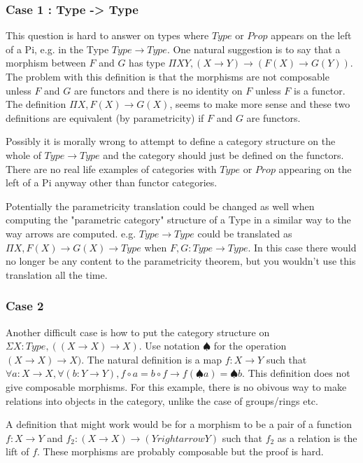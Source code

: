 \documentclass[12pt]{article} %
\theoremstyle{definition}
\theoremstyle{definition}
\theoremstyle{definition}
\theoremstyle{definition}
\begin{document}
\subsubsection{Case 1 : Type -> Type}

This question is hard to answer on types where $Type$ or $Prop$ appears on the left of a Pi,
e.g. in the Type $Type\rightarrow Type$. One natural suggestion is to say that a morphism between
$F$ and $G$ has type $\Pi X Y, (X \rightarrow Y) \rightarrow (F(X) \rightarrow G(Y))$. The problem 
with this definition is that the morphisms are not composable unless $F$ and $G$ are functors and 
there is no identity on $F$ unless $F$ is a functor. The definition $\Pi X, F(X) \rightarrow G(X)$,
seems to make more sense and these two definitions are equivalent (by parametricity) if $F$ and
$G$ are functors.

Possibly it is morally wrong to attempt to define a category structure on the whole of
$Type \rightarrow Type$ and the category should just be defined on the functors. 
There are no real life examples of categories with $Type$ or $Prop$ appearing on the left of a 
Pi anyway other than functor categories.

Potentially the parametricity translation could be changed as well when computing the 
"parametric category" structure of a Type in a similar way to the way arrows are computed.
e.g. $Type \rightarrow Type$ could be translated as 
$\Pi X, F(X) \rightarrow G(X) \rightarrow Type$ when $F,G : Type \rightarrow Type$. 
In this case there would no longer be any content to the parametricity theorem, but
you wouldn't use this translation all the time.

\subsubsection{Case 2}
Another difficult case is how to put the category structure on $\Sigma X : Type, ((X \rightarrow X) \rightarrow X)$.
Use notation $\spadesuit$ for the operation $(X \rightarrow X) \rightarrow X)$.
The natural definition is a map $f : X \rightarrow Y$ such that $\forall a : X \rightarrow X, 
\forall (b : Y \rightarrow Y), f \circ a = b \circ f \rightarrow f (\spadesuit a) = \spadesuit b$.
This definition does not give composable morphisms. For this example, there is no obivous way to make relations
into objects in the category, unlike the case of groups/rings etc.

A definition that might work would be for a morphism to be a pair of a 
function $f : X \rightarrow Y$ and $f_2 : (X \rightarrow X) \rightarrow (Y 
rightarrow Y)$ such that $f_2$ as a relation is the lift of $f$.
These morphisms are probably composable but the proof is hard.
\end{document}
